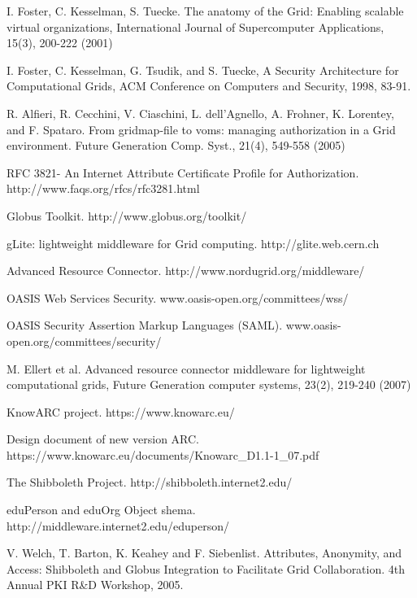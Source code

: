 \documentclass[conference]{IEEEtran}
\begin{document}
\begin{thebibliography}{1}

I. Foster, C. Kesselman, S. Tuecke. The anatomy of the Grid: Enabling scalable virtual organizations, International Journal of Supercomputer Applications, 15(3), 200-222 (2001)

I. Foster, C. Kesselman, G. Tsudik, and S. Tuecke, A Security Architecture for Computational Grids, ACM Conference on Computers and Security, 1998, 83-91.

R. Alfieri, R. Cecchini, V. Ciaschini, L. dell’Agnello, A. Frohner, K. Lorentey, and F. Spataro. From gridmap-file to voms: managing authorization in a Grid environment. Future Generation Comp. Syst., 21(4), 549-558 (2005)

RFC 3821- An Internet Attribute Certificate Profile for Authorization. http://www.faqs.org/rfcs/rfc3281.html

Globus Toolkit. http://www.globus.org/toolkit/

gLite: lightweight middleware for Grid computing. http://glite.web.cern.ch

Advanced Resource Connector. http://www.nordugrid.org/middleware/

OASIS Web Services Security. www.oasis-open.org/committees/wss/

OASIS Security Assertion Markup Languages (SAML). www.oasis-open.org/committees/security/

M. Ellert et al. Advanced resource connector middleware for lightweight computational grids, Future Generation computer systems, 23(2), 219-240 (2007)

KnowARC project.  https://www.knowarc.eu/

Design document of new version ARC. https://www.knowarc.eu/documents/Knowarc\_D1.1-1\_07.pdf

The Shibboleth Project. http://shibboleth.internet2.edu/

eduPerson and eduOrg Object shema. http://middleware.internet2.edu/eduperson/

V. Welch, T. Barton, K. Keahey and F. Siebenlist. Attributes, Anonymity, and Access: Shibboleth and Globus Integration to Facilitate Grid Collaboration. 4th Annual PKI R\&D Workshop, 2005.


\end{thebibliography}
\end{document}
